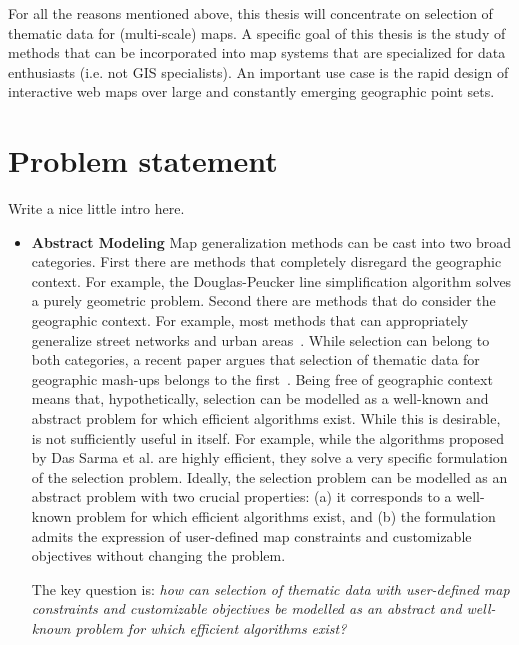 \documentclass[11pt, oneside]{report}
\begin{document}
For all the reasons mentioned above, this thesis will concentrate on selection of thematic data for (multi-scale) maps. A specific goal of this thesis is the study of methods that can be incorporated into map systems that are specialized for data enthusiasts (i.e. not GIS specialists). An important use case is the rapid design of interactive web maps over large and constantly emerging geographic point sets.

\section{Problem statement}
\label{introduction:problem:statement}

Write a nice little intro here.

\begin{itemize}

\item \textbf{Abstract Modeling} 
Map generalization methods can be cast into two broad categories. First there are methods that completely disregard the geographic context. For example, the Douglas-Peucker line simplification algorithm solves a purely geometric problem. Second there are methods that do consider the geographic context. For example, most methods that can appropriately generalize street networks and urban areas~\cite{lamy1999application}. While selection can belong to both categories, a recent paper argues that selection of thematic data for geographic mash-ups belongs to the first~\cite{sarma2012fusiontables}. Being free of geographic context means that, hypothetically, selection can be modelled as a well-known and abstract problem for which efficient algorithms exist. While this is desirable, is not sufficiently useful in itself. For example, while the algorithms proposed by Das Sarma et al. are highly efficient, they solve a very specific formulation of the selection problem. Ideally, the selection problem can be modelled as an abstract problem with two crucial properties: (a) it corresponds to a well-known problem for which efficient algorithms exist, and (b) the formulation admits the expression of user-defined map constraints and customizable objectives without changing the problem.

The key question is: \emph{how can selection of thematic data with user-defined map constraints and customizable objectives be modelled as an abstract and well-known problem for which efficient algorithms exist?}


\end{itemize}
\end{document}
